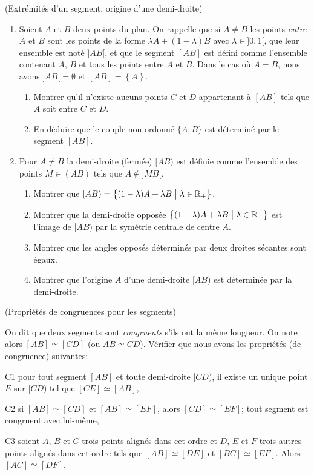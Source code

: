 \documentclass[a4paper,11pt,reqno]{amsart}
\newcommand*{\ensemble}[3][]{#1\{ #2 \;#1|\; #3 #1\}} %
\begin{document}
\begin{exo} (Extrémités d'un segment, origine d'une demi-droite)

  \begin{enumerate}
    \item Soient $A$ et $B$ deux points du plan. On rappelle que si $A \neq B$ les points \emph{entre} $A$ et $B$ sont les points de la forme $\lambda A + (1-\lambda) B$ avec $\lambda \in ]0,1[$, que leur ensemble est noté $]AB[$, et que le segment $[AB]$ est défini comme l'ensemble contenant $A$, $B$ et tous les points entre $A$ et $B$. Dans le cas où $A=B$, nous avons $]AB[ = \emptyset$ et $[AB] = \left\{ A \right\}$.
    \begin{enumerate}
      \item Montrer qu'il n'existe aucuns points $C$ et $D$ appartenant à $[AB]$ tels que $A$ soit entre $C$ et $D$.
      \item En déduire que le couple non ordonné $\{A,B\}$ est déterminé par le segment $[AB]$.
    \end{enumerate}
    \item Pour $A \neq B$ la demi-droite (fermée) $[AB)$ est définie comme l'ensemble des points $M \in (AB)$ tels que $A \notin ]MB[$.
    \begin{enumerate}
      \item Montrer que $[AB) = \ensemble[\big]{(1- \lambda )A + \lambda B}{\lambda \in \R_{+}}$.
      \item Montrer que la demi-droite opposée $\ensemble[\big]{(1- \lambda )A + \lambda B}{\lambda \in \R_{-}}$ est l'image de $[AB)$ par la symétrie centrale de centre $A$.
      \item Montrer que les angles opposés déterminés par deux droites sécantes sont égaux.
      \item Montrer que l'origine $A$ d'une demi-droite $[AB)$ est déterminée par la demi-droite.
    \end{enumerate}
  \end{enumerate}
\end{exo}

\begin{exo} (Propriétés de congruences pour les segments)

On dit que deux segments sont \emph{congruents} s'ils ont la même longueur. On note alors $[AB]\simeq[CD]$ (ou $AB \simeq CD$). Vérifier que nous avons les propriétés (de congruence) suivantes:
  \begin{axioms}[leftmargin=2.8em]
    \item[C1] pour tout segment $[AB]$ et toute demi-droite $[CD)$, il existe un unique point $E$ sur $[CD)$ tel que $[CE]\simeq[AB]$,
    \item[C2] si $[AB]\simeq[CD]$ et $[AB]\simeq[EF]$, alors $[CD]\simeq[EF]$; tout segment est congruent avec lui-même,
    \item[C3] soient $A$, $B$ et $C$ trois points alignés dans cet ordre et $D$, $E$ et $F$ trois autres points alignés dans cet ordre tels que $[AB]\simeq [DE]$ et $[BC]\simeq[EF]$. Alors $[AC]\simeq[DF]$.
  \end{axioms}
\end{exo}
\end{document}
